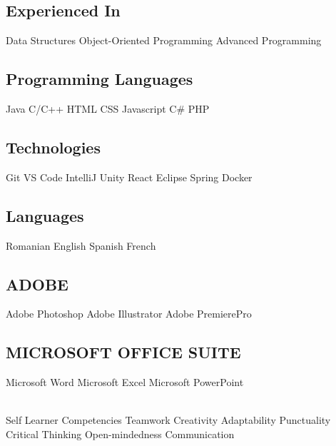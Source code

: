 \documentclass[a4paper]{MagicalCV}
\begin{document}
\hfill
\begin{minipage}[t]{0.59\textwidth} 


\subsection{Experienced In}
Data Structures \textbullet{} Object-Oriented Programming \textbullet{} Advanced Programming
\sectionsep

\subsection{Programming Languages}
Java \textbullet{} C/C++ \textbullet{} HTML \textbullet{} CSS \textbullet{} Javascript \textbullet{} C\# \textbullet{} PHP
\sectionsep

\subsection{Technologies}
Git \textbullet{} VS Code \textbullet{} IntelliJ \textbullet{} Unity \textbullet{} React \textbullet{} Eclipse \textbullet{} Spring \textbullet{} Docker
\sectionsep

\subsection{Languages}
Romanian \textbullet{} English \textbullet{} Spanish \textbullet{} French
\sectionsep

\subsection{ADOBE}
Adobe Photoshop \textbullet{} Adobe Illustrator \textbullet{} Adobe PremierePro
\sectionsep

\subsection{MICROSOFT OFFICE SUITE}
Microsoft Word \textbullet{} Microsoft Excel \textbullet{} Microsoft PowerPoint
\sectionsep

 \\
Self Learner \textbullet{} Competencies \textbullet{} Teamwork \textbullet{} Creativity \textbullet{} Adaptability \textbullet{} Punctuality \textbullet{} Critical Thinking \textbullet{} Open-mindedness \textbullet{} Communication
\sectionsep


\end{minipage}
\end{document}
